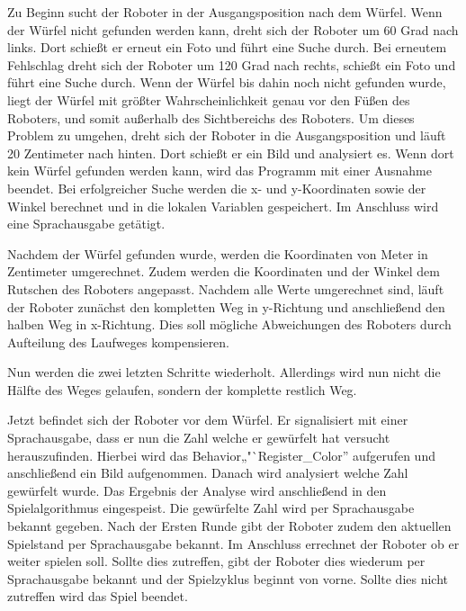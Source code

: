     Zu Beginn sucht der Roboter in der Ausgangsposition nach dem Würfel.
    Wenn der Würfel nicht gefunden werden kann, dreht sich der Roboter um
    60 Grad nach links.
    Dort schießt er erneut ein Foto und führt eine Suche durch.
    Bei erneutem Fehlschlag dreht sich der Roboter um 120 Grad nach rechts,
    schießt ein Foto und führt eine Suche durch.
    Wenn der Würfel bis dahin noch nicht gefunden wurde, liegt der Würfel
    mit größter Wahrscheinlichkeit genau vor den Füßen des Roboters, und somit
    außerhalb des Sichtbereichs des Roboters.
    Um dieses Problem zu umgehen, dreht sich der Roboter in die
    Ausgangsposition und läuft 20 Zentimeter nach hinten.
    Dort schießt er ein Bild und analysiert es.
    Wenn dort kein Würfel gefunden werden kann, wird das Programm
    mit einer Ausnahme beendet.
    Bei erfolgreicher Suche werden die x- und y-Koordinaten sowie der Winkel
    berechnet und in die lokalen Variablen gespeichert.
    Im Anschluss wird eine Sprachausgabe getätigt.

    Nachdem der Würfel gefunden wurde, werden die Koordinaten von
    Meter in Zentimeter umgerechnet.
    Zudem werden die Koordinaten und der Winkel dem Rutschen des Roboters
    angepasst.
    Nachdem alle Werte umgerechnet sind, läuft der
    Roboter zunächst den kompletten Weg in y-Richtung und anschließend den
    halben Weg in x-Richtung.
    Dies soll mögliche Abweichungen des Roboters durch Aufteilung des Laufweges
    kompensieren.

    Nun werden die zwei letzten Schritte wiederholt.
    Allerdings wird nun nicht die Hälfte des Weges gelaufen, sondern der
    komplette restlich Weg.

    Jetzt befindet sich der Roboter vor dem Würfel.
    Er signalisiert mit einer Sprachausgabe, dass er nun die Zahl welche er
    gewürfelt hat versucht herauszufinden.
    Hierbei wird das Behavior„"`Register\_Color'' aufgerufen und
    anschließend ein Bild aufgenommen.
    Danach wird analysiert welche Zahl gewürfelt wurde.
    Das Ergebnis der Analyse wird anschließend in den Spielalgorithmus
    eingespeist.
    Die gewürfelte Zahl wird per Sprachausgabe bekannt gegeben.
    Nach der Ersten Runde gibt der Roboter zudem den aktuellen Spielstand per
    Sprachausgabe bekannt.
    Im Anschluss errechnet der Roboter ob er weiter spielen soll.
    Sollte dies zutreffen, gibt der Roboter dies wiederum per Sprachausgabe
    bekannt und der Spielzyklus beginnt von vorne.
    Sollte dies nicht zutreffen wird das Spiel beendet.

